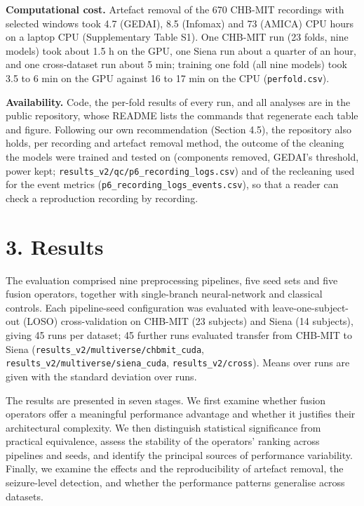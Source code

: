 \documentclass[11pt,a4paper]{article}
\begin{document}
\textbf{Computational cost.} Artefact removal of the 670 CHB-MIT recordings with selected
windows took 4.7 (GEDAI), 8.5 (Infomax) and 73 (AMICA) CPU hours on a laptop CPU
(Supplementary Table S1). One CHB-MIT run (23 folds, nine models) took about 1.5 h on
the GPU, one Siena run about a quarter of an hour, and one cross-dataset run about
5 min; training one fold (all nine models) took 3.5 to 6 min on the GPU against 16 to
17 min on the CPU (\nolinkurl{perfold.csv}).

\textbf{Availability.} Code, the per-fold results of every run, and all analyses are in the
public repository, whose README lists the commands that regenerate each table and figure.
Following our own recommendation (Section 4.5), the repository also holds, per recording
and artefact removal method, the outcome of the cleaning the models were trained and
tested on (components removed, GEDAI's threshold, power kept;
\nolinkurl{results_v2/qc/p6_recording_logs.csv}) and of the recleaning used for the event metrics
(\nolinkurl{p6_recording_logs_events.csv}), so that a reader can check a reproduction recording
by recording.

\section{3. Results}\label{results}

The evaluation comprised nine preprocessing pipelines, five seed sets and five fusion
operators, together with single-branch neural-network and classical controls. Each
pipeline-seed configuration was evaluated with leave-one-subject-out (LOSO)
cross-validation on CHB-MIT (23 subjects) and Siena (14 subjects), giving 45 runs per
dataset; 45 further runs evaluated transfer from CHB-MIT to Siena
(\nolinkurl{results_v2/multiverse/chbmit_cuda}, \nolinkurl{results_v2/multiverse/siena_cuda},
\nolinkurl{results_v2/cross}). Means over runs are given with the standard deviation over runs.

The results are presented in seven stages. We first examine whether fusion operators
offer a meaningful performance advantage and whether it justifies their architectural
complexity. We then distinguish statistical significance from practical equivalence,
assess the stability of the operators' ranking across pipelines and seeds, and identify
the principal sources of performance variability. Finally, we examine the effects and
the reproducibility of artefact removal, the seizure-level detection, and whether the
performance patterns generalise across datasets.
\end{document}
